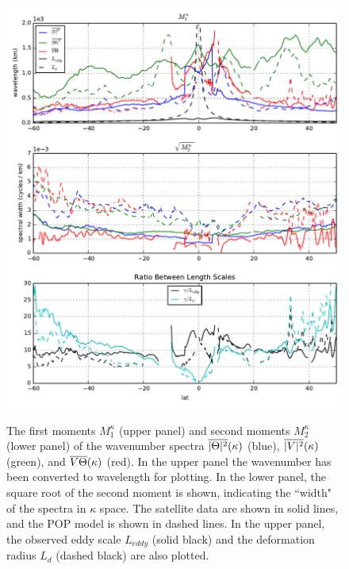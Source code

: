 \documentclass[10pt]{article}
\newcommand{\ol}{\ensuremath{\overline}}
\begin{document}
\begin{figure}[t]
  \noindent\includegraphics{../figures/moments_k.pdf}\\
  \caption{The first moments $M_1^\kappa$ (upper panel) and second moments $M_2^\kappa$ (lower panel) of the wavenumber spectra $\ol{|\Theta|^2}(\kappa)$ (blue), $\ol{|V|^2}(\kappa)$ (green), and $\ol{V\Theta}(\kappa)$ (red). In the upper panel the wavenumber has been converted to wavelength for plotting. In the lower panel, the square root of the second moment is shown, indicating the ``width" of the spectra in $\kappa$ space. The satellite data are shown in solid lines, and the POP model is shown in dashed lines. In the upper panel, the observed eddy scale $L_{eddy}$ (solid black) and the deformation radius $L_{d}$ (dashed black) are also plotted. }
  \label{fig:moments_k}
\end{figure}
\end{document}
